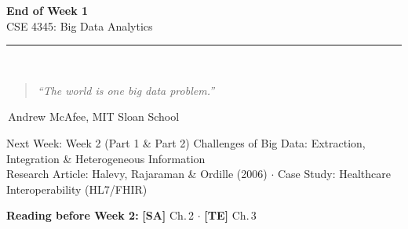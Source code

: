 \documentclass[aspectratio=169,10pt]{beamer}
\begin{document}
\begin{frame}[c]
  \begin{center}
    {\Large\bfseries End of Week 1}\\[10pt]
    {\large CSE 4345: Big Data Analytics}\\[8pt]
    \textcolor{PUGray}{\rule{7cm}{0.5pt}}\\[10pt]
    \begin{quote}
      \itshape ``The world is one big data problem.''
    \end{quote}
    \hfill\textemdash\,Andrew McAfee, MIT Sloan School
    \vspace{16pt}
    \begin{block}{\centering Next Week: Week 2 (Part 1 \& Part 2)}
      \centering
      Challenges of Big Data: Extraction, Integration \& Heterogeneous Information\\[4pt]
      \small Research Article: Halevy, Rajaraman \& Ordille (2006) $\cdot$ Case Study: Healthcare Interoperability (HL7/FHIR)
    \end{block}
    \vspace{8pt}
    \textbf{Reading before Week 2:} \textbf{[SA]} Ch.\,2 $\cdot$ \textbf{[TE]} Ch.\,3
  \end{center}
\end{frame}

\end{document}
